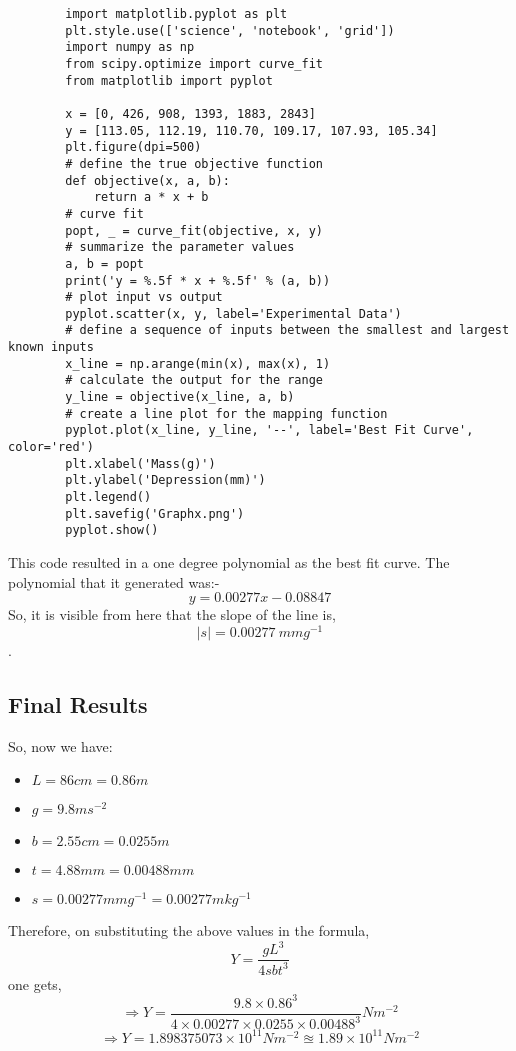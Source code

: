 \documentclass[12pt]{article}
\begin{document}
	\begin{lstlisting}
		import matplotlib.pyplot as plt
		plt.style.use(['science', 'notebook', 'grid'])
		import numpy as np
		from scipy.optimize import curve_fit
		from matplotlib import pyplot
		
		x = [0, 426, 908, 1393, 1883, 2843]
		y = [113.05, 112.19, 110.70, 109.17, 107.93, 105.34]
		plt.figure(dpi=500)
		# define the true objective function
		def objective(x, a, b):
			return a * x + b
		# curve fit
		popt, _ = curve_fit(objective, x, y)
		# summarize the parameter values
		a, b = popt
		print('y = %.5f * x + %.5f' % (a, b))
		# plot input vs output
		pyplot.scatter(x, y, label='Experimental Data')
		# define a sequence of inputs between the smallest and largest known inputs
		x_line = np.arange(min(x), max(x), 1)
		# calculate the output for the range
		y_line = objective(x_line, a, b)
		# create a line plot for the mapping function
		pyplot.plot(x_line, y_line, '--', label='Best Fit Curve', color='red')
		plt.xlabel('Mass(g)')
		plt.ylabel('Depression(mm)')
		plt.legend()
		plt.savefig('Graphx.png')
		pyplot.show()
	\end{lstlisting}
	
	This code resulted in a one degree polynomial as the best fit curve. The polynomial that it generated was:-
	$$y = 0.00277  x - 0.08847$$
	So, it is visible from here that the slope of the line is, $$|s| = 0.00277\ mmg^{-1}$$.
	
	\pagebreak
	
	\subsection{Final Results}
	
	So, now we have:
	\begin{itemize}
		\item $L = 86cm = 0.86m$
		\item $g = 9.8ms^{-2}$
		\item $b = 2.55cm = 0.0255m$
		\item $t = 4.88mm = 0.00488mm$
		\item $s = 0.00277mmg^{-1} = 0.00277mkg^{-1}$
	\end{itemize}

	Therefore, on substituting the above values in the formula,
	$$Y=\dfrac{gL^{3}}{4sbt^{3}}$$
	one gets,
	$$\Rightarrow Y = \dfrac{9.8 \times 0.86^{3}}{4 \times 0.00277 \times 0.0255 \times 0.00488^{3}} Nm^{-2}$$
	$$\Rightarrow Y = 1.898375073 \times 10^{11}Nm^{-2} \approxeq 1.89 \times 10^{11} Nm^{-2}$$
	
\end{document}
